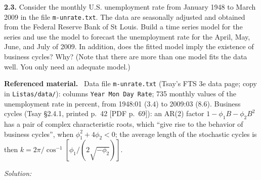 \documentclass[11pt,a4paper]{article}
\newif\ifsolucoes
\newcommand{\espacoresol}{4.5cm}   %
\newenvironment{refmat}{\par\smallskip\noindent\begin{minipage}{\linewidth}\small\textbf{Referenced material.}~}{\end{minipage}\par\smallskip}
\newcommand{\resolespaco}{\ifsolucoes\else\par\textit{Solution:}\vspace{\espacoresol}\par\fi}
\begin{document}
\noindent\textbf{2.3.} Consider the monthly U.S. unemployment rate from January 1948 to March 2009 in the
file \texttt{m-unrate.txt}. The data are seasonally adjusted and obtained from the Federal Reserve Bank of
St Louis. Build a time series model for the series and use the model to forecast the unemployment rate for
the April, May, June, and July of 2009. In addition, does the fitted model imply the existence of business
cycles? Why? (Note that there are more than one model fits the data well. You only need an adequate model.)
\begin{refmat}
Data file \texttt{m-unrate.txt} (Tsay's FTS 3e data page; copy in \texttt{Listas/data/}): columns
\texttt{Year Mon Day Rate}; 735 monthly values of the unemployment rate in percent, from 1948:01 ($3.4$) to
2009:03 ($8.6$). Business cycles (Tsay \S2.4.1, printed p.~42 [PDF p.~69]): an AR(2) factor
$1-\phi_1B-\phi_2B^2$ has a pair of complex characteristic roots, which ``give rise to the behavior of
business cycles'', when $\phi_1^2+4\phi_2<0$; the average length of the stochastic cycles is then
$k=2\pi/\cos^{-1}[\phi_1/(2\sqrt{-\phi_2})]$.
\end{refmat}
\resolespaco
\end{document}
